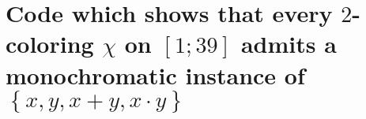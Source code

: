 \chapter{Code which shows that every $2$-coloring $\chi$ on $[1; 39]$ admits a monochromatic instance of $\left\{x, y, x + y, x \cdot y\right\}$}\label{app:schur_code}

